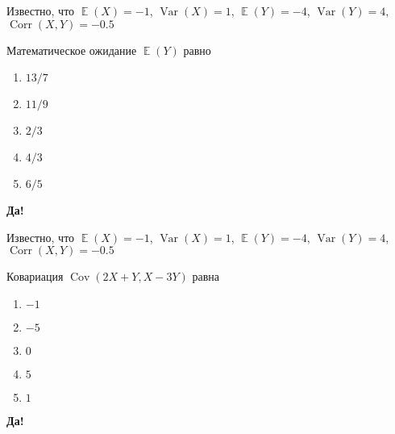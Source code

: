 \documentclass[t]{beamer}
\DeclareMathOperator{\Var}{Var}
\DeclareMathOperator{\Cov}{Cov}
\DeclareMathOperator{\Corr}{Corr}
\DeclareMathOperator{\E}{\mathbb{E}}
\begin{document}
 \begin{frame} \label{24-Yes} 
\begin{block}{24} 

Известно, что $\E(X)=-1$, $\Var(X)=1$, $\E(Y)=-4$, $\Var(Y)=4$, $\Corr(X,Y)=-0.5$

\vspace{0.5cm} 
 
Математическое ожидание $\E(Y)$ равно
 


 \end{block} 
\begin{enumerate} 
\item[] \hyperlink{24-No}{\beamergotobutton{} $13/7$
}
\item[] \hyperlink{24-Yes}{\beamergotobutton{} $11/9$}
\item[] \hyperlink{24-No}{\beamergotobutton{} $2/3$}
\item[] \hyperlink{24-No}{\beamergotobutton{} $4/3$}
\item[] \hyperlink{24-No}{\beamergotobutton{} $6/5$}
\end{enumerate} 

 \textbf{Да!} 
 \hyperlink{25}{}\end{frame} 


 \begin{frame} \label{25-Yes} 
\begin{block}{25} 

Известно, что $\E(X)=-1$, $\Var(X)=1$, $\E(Y)=-4$, $\Var(Y)=4$, $\Corr(X,Y)=-0.5$

\vspace{0.5cm} 
 
Ковариация $\Cov(2X+Y,X-3Y)$ равна
 


 \end{block} 
\begin{enumerate} 
\item[] \hyperlink{25-No}{\beamergotobutton{} $-1$
}
\item[] \hyperlink{25-Yes}{\beamergotobutton{} $-5$}
\item[] \hyperlink{25-No}{\beamergotobutton{} $0$}
\item[] \hyperlink{25-No}{\beamergotobutton{} $5$}
\item[] \hyperlink{25-No}{\beamergotobutton{} $1$}
\end{enumerate} 

 \textbf{Да!} 
 \hyperlink{26}{}\end{frame} 
\end{document}

